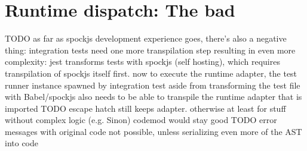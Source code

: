 \section{Runtime dispatch: The bad}
TODO as far as spockjs development experience goes, there's also a negative thing: integration tests need one more transpilation step resulting in even more complexity: jest transforms tests with spockjs (self hosting), which requires transpilation of spockjs itself first. now to execute the runtime adapter, the test runner instance spawned by integration test aside from transforming the test file with Babel/spockjs also needs to be able to transpile the runtime adapter that is imported
TODO escape hatch still keeps adapter. otherwise at least for stuff without complex logic (e.g. Sinon) codemod would stay good
TODO error messages with original code not possible, unless serializing even more of the AST into code
